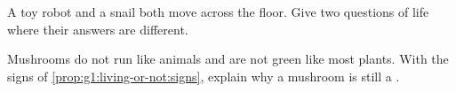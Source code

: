 \begin{exercise}[$\star\star$]\label{exo:g1:living-or-not:9}
A toy robot and a snail both move across the floor. Give two
questions of life where their answers are different.
\end{exercise}

\begin{exercise}[$\star\star$]\label{exo:g1:living-or-not:10}
Mushrooms do not run like animals and are not green like most
plants. With the signs of \cref{prop:g1:living-or-not:signs},
explain why a mushroom is still a .
\end{exercise}

